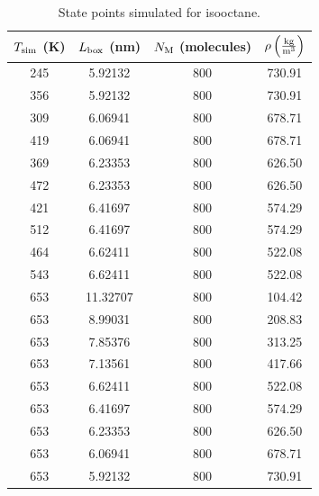 \documentclass[journal=jctc,manuscript=article]{achemso}
\begin{document}
\begin{table}[p!]
	\caption{State points simulated for isooctane.} \label{tab:IC8H18 state points}
	\begin{center}
		\begin{tabular}{|c|c|c|c|}
			\hline
			$T_{\rm sim}$ (K) & $L_{\rm box}$ (nm) & $N_{\rm M}$ (molecules) & $\rho \left(\frac{\rm kg}{\rm m^3}\right)$ \\ \hline
			245 & 5.92132  & 800 & 730.91 \\
			356 & 5.92132  & 800 & 730.91 \\
			309 & 6.06941  & 800 & 678.71 \\
			419 & 6.06941  & 800 & 678.71 \\
			369 & 6.23353  & 800 & 626.50 \\
			472 & 6.23353  & 800 & 626.50 \\
			421 & 6.41697  & 800 & 574.29 \\
			512 & 6.41697  & 800 & 574.29 \\
			464 & 6.62411  & 800 & 522.08 \\
			543 & 6.62411  & 800 & 522.08 \\
			653 & 11.32707 & 800 & 104.42 \\
			653 & 8.99031  & 800 & 208.83 \\
			653 & 7.85376  & 800 & 313.25 \\
			653 & 7.13561  & 800 & 417.66 \\
			653 & 6.62411  & 800 & 522.08 \\
			653 & 6.41697  & 800 & 574.29 \\
			653 & 6.23353  & 800 & 626.50 \\
			653 & 6.06941  & 800 & 678.71 \\
			653 & 5.92132  & 800 & 730.91 \\
			\hline
		\end{tabular}
	\end{center}
\end{table}
\end{document}
